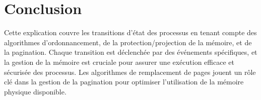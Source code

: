 \section*{Conclusion}

Cette explication couvre les transitions d'état des processus en tenant compte des algorithmes d'ordonnancement, de la protection/projection de la mémoire, et de la pagination. Chaque transition est déclenchée par des événements spécifiques, et la gestion de la mémoire est cruciale pour assurer une exécution efficace et sécurisée des processus. Les algorithmes de remplacement de pages jouent un rôle clé dans la gestion de la pagination pour optimiser l'utilisation de la mémoire physique disponible.
